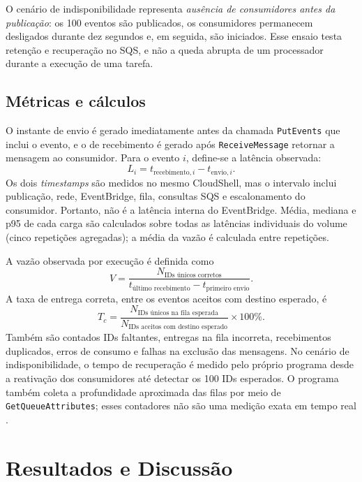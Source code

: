 \documentclass[12pt]{article}
\begin{document}
O cenário de indisponibilidade representa \emph{ausência de consumidores
antes da publicação}: os 100 eventos são publicados, os consumidores
permanecem desligados durante dez segundos e, em seguida, são iniciados.
Esse ensaio testa retenção e recuperação no SQS, e não a queda abrupta de um
processador durante a execução de uma tarefa.

\subsection{Métricas e cálculos}
O instante de envio é gerado imediatamente antes da chamada
\texttt{PutEvents} que inclui o evento, e o de recebimento é gerado após
\texttt{ReceiveMessage} retornar a mensagem ao consumidor. Para o evento
\(i\), define-se a latência observada:
\begin{equation}
L_i=t_{\text{recebimento},i}-t_{\text{envio},i}.
\end{equation}
Os dois \emph{timestamps} são medidos no mesmo CloudShell, mas o intervalo
inclui publicação, rede, EventBridge, fila, consultas SQS e escalonamento do
consumidor. Portanto, não é a latência interna do EventBridge. Média, mediana
e p95 de cada carga são calculados sobre todas as latências individuais do
volume (cinco repetições agregadas); a média da vazão é calculada entre
repetições.

A vazão observada por execução é definida como
\begin{equation}
V=\frac{N_{\text{IDs únicos corretos}}}
{t_{\text{último recebimento}}-t_{\text{primeiro envio}}}.
\end{equation}
A taxa de entrega correta, entre os eventos aceitos com destino esperado, é
\begin{equation}
T_c=\frac{N_{\text{IDs únicos na fila esperada}}}
{N_{\text{IDs aceitos com destino esperado}}}\times100\%.
\end{equation}
Também são contados IDs faltantes, entregas na fila incorreta, recebimentos
duplicados, erros de consumo e falhas na exclusão das mensagens. No cenário
de indisponibilidade, o tempo de recuperação é medido pelo próprio programa
desde a reativação dos consumidores até detectar os 100 IDs esperados. O
programa também coleta a profundidade aproximada das filas por meio de
\texttt{GetQueueAttributes}; esses contadores não são uma medição exata em
tempo real \cite{aws-sqs-metricas}.

\section{Resultados e Discussão}
\end{document}
